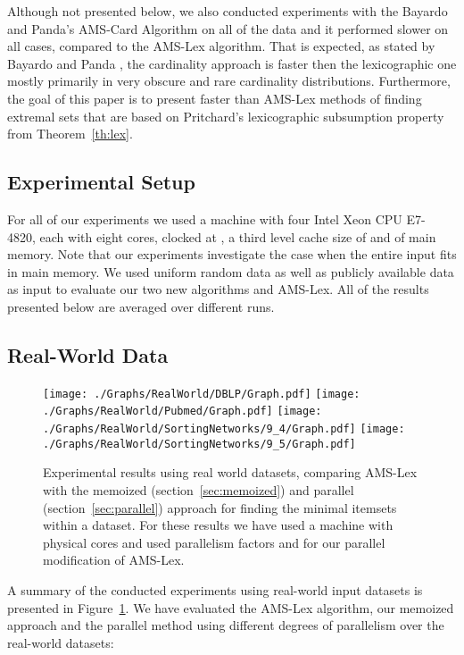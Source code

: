 \documentclass[13pt,a4paper]{article}
\begin{document}
Although not presented below, we also conducted experiments with the Bayardo and Panda's AMS-Card Algorithm on all of the data and it performed slower on all cases, compared to the AMS-Lex algorithm. That is expected, as stated by Bayardo and Panda \cite{BayardoPanda11}, the cardinality approach is faster then the lexicographic one mostly primarily in very obscure and rare cardinality distributions. Furthermore, the goal of this paper is to present faster than AMS-Lex methods of finding extremal sets that are based on Pritchard's lexicographic subsumption property from Theorem~\ref{th:lex}.

\subsection{Experimental Setup}
For all of our experiments we used a machine with four Intel Xeon CPU E7- 4820, each with eight cores, clocked at , a third level cache size of  and  of main memory. Note that our experiments investigate the case when the entire input fits in main memory. We used uniform random data as well as publicly available data as input to evaluate our two new algorithms and AMS-Lex. All of the results presented below are averaged over  different runs.


\subsection{Real-World Data}

\begin{figure} [t]
	\centering
	\texttt{[image: ./Graphs/RealWorld/DBLP/Graph.pdf]}
	\texttt{[image: ./Graphs/RealWorld/Pubmed/Graph.pdf]}
	\texttt{[image: ./Graphs/RealWorld/SortingNetworks/9\_4/Graph.pdf]}
	\texttt{[image: ./Graphs/RealWorld/SortingNetworks/9\_5/Graph.pdf]}
	\caption{Experimental results using real world datasets, comparing AMS-Lex with the memoized (section~\ref{sec:memoized}) and parallel (section~\ref{sec:parallel}) approach for finding the minimal itemsets within a dataset. For these results we have used a machine with  physical cores and used parallelism factors  and  for our parallel modification of AMS-Lex.}
	\label{fig:exp:real}
\end{figure}

A summary of the conducted experiments using real-world input datasets is presented in Figure~\ref{fig:exp:real}. We have evaluated the AMS-Lex algorithm, our memoized approach and the parallel method using different degrees of parallelism over the real-world datasets:
\end{document}

